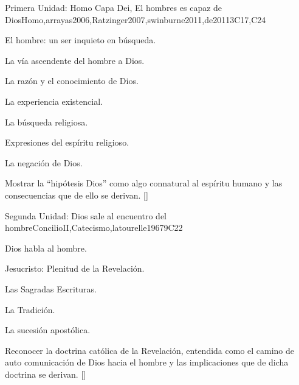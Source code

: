 \begin{syllabus}
\begin{unit}{}{Primera Unidad: Homo Capa Dei, El hombres es capaz de Dios}{Homo,arrayas2006,Ratzinger2007,swinburne2011,de2011}{3}{C17,C24}
\begin{topics}
	\item El hombre: un ser inquieto en búsqueda.
	\item La vía ascendente del hombre a Dios.
	      \begin{subtopics}
		\item La razón y el conocimiento de Dios.
		\item La experiencia existencial.
		\item La búsqueda religiosa.
	      \end{subtopics}
	\item Expresiones del espíritu religioso.
	\item La negación de Dios.
\end{topics}
\begin{learningoutcomes}
	\item Mostrar la ``hipótesis Dios'' como algo connatural al espíritu humano y las consecuencias que de ello se derivan. [\Familiarity]
\end{learningoutcomes}
\end{unit}

\begin{unit}{}{Segunda Unidad: Dios sale al encuentro del hombre}{ConcilioII,Catecismo,latourelle1967}{9}{C22}
\begin{topics}
	\item Dios habla al hombre.
	\item Jesucristo: Plenitud de la Revelación.
	\item Las Sagradas Escrituras.
	\item La Tradición.
	\item La sucesión apostólica.
\end{topics}
\begin{learningoutcomes}
	\item Reconocer la doctrina católica de la Revelación, entendida como el camino de auto comunicación de Dios hacia el hombre y las implicaciones que de dicha doctrina se derivan. [\Familiarity]
\end{learningoutcomes}
\end{unit}


\end{syllabus}

